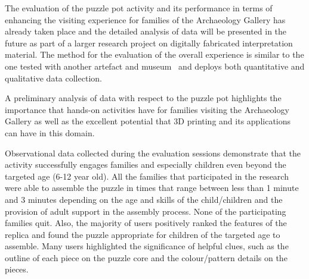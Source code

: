 \documentclass[acmlarge,screen,dvipsnames]{acmart}
\begin{document}
%
%
\greenBegin%
The evaluation of the puzzle pot activity 
and its performance in terms of enhancing the visiting experience for families 
of the Archaeology Gallery has already taken place and the detailed analysis 
of data will be presented in the future as part of a larger research project 
on digitally fabricated interpretation material. The method for the evaluation 
of the overall experience is similar to the one tested with another artefact 
and museum~\cite{Samaroudi2017,10.1007/978-3-030-23089-0_7} and deploys both 
quantitative and qualitative data collection.


A preliminary analysis of data with respect to the puzzle 
pot highlights the importance that hands-on activities have for families 
visiting the Archaeology Gallery as well as the excellent potential 
that 3D printing and its applications can have in this domain. 

Observational data collected during the evaluation sessions
demonstrate that the activity successfully engages families and
especially children even beyond the targeted age (6-12 year old). All
the families that participated in the research were able to assemble
the puzzle in times that range between less than 1 minute and 3 minutes
depending on the age and skills of the child/children and the
provision of adult support in the assembly process. None of the
participating families quit. Also, the majority of users positively
ranked the features of the replica and found the puzzle appropriate
for children of the targeted age to assemble. Many users highlighted
the significance of helpful clues, such as the outline of each piece
on the puzzle core and the colour/pattern details on the pieces. 
\end{document}
